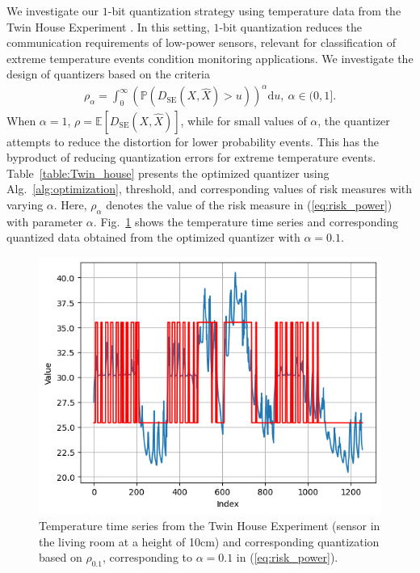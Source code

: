\documentclass[conference]{IEEEtran}
\begin{document}
We investigate our $1$-bit quantization strategy using temperature data from the Twin House Experiment \cite{Kersken2020}. In this setting, $1$-bit quantization reduces the communication requirements of low-power sensors, relevant for classification of extreme temperature events condition monitoring applications. We investigate the design of quantizers based on the criteria 
\begin{align}\label{eq:risk_power}
	\rho_{\alpha} = \int_0^{\infty} \left(\mathbb{P}(D_{\mathrm{SE}}(X,\hat{X}) > u)\right)^{\alpha}\mathrm{d}u,~\alpha \in (0,1].
\end{align} 
When $\alpha = 1$, $\rho = \mathbb{E}[D_{\mathrm{SE}}(X,\hat{X})]$, while for small values of $\alpha$, the quantizer attempts to reduce the distortion for lower probability events. This has the byproduct of reducing quantization errors for extreme temperature events. Table~\ref{table:Twin_house} presents the optimized quantizer using Alg.~\ref{alg:optimization}, threshold, and corresponding values of risk measures with varying $\alpha$. Here, $\rho_{\alpha}$ denotes the value of the risk measure in (\ref{eq:risk_power}) with parameter $\alpha$. Fig.~\ref{fig:time_series} shows the temperature time series and corresponding quantized data obtained from the optimized quantizer with $\alpha = 0.1$.  

\begin{figure}
	\centering
	\includegraphics[width=\linewidth]{time_series.png}%
	\caption{Temperature time series from the Twin House Experiment \cite{Kersken2020} (sensor in the living room at a height of 10cm) and corresponding quantization based on $\rho_{0.1}$, corresponding to $\alpha = 0.1$ in (\ref{eq:risk_power}).}
	\label{fig:time_series}
\end{figure}
\end{document}
